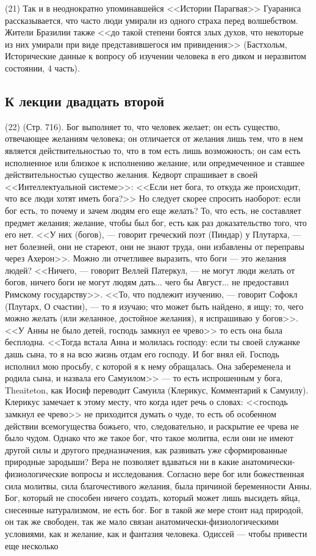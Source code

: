 \documentclass[12pt]{article}
\begin{document}
(21) Так и в неоднократно упоминавшейся <<Истории Парагвая>> Гуараниса рассказывается, что часто люди умирали из одного страха перед волшебством. Жители Бразилии также <<до такой степени боятся злых духов, что некоторые из них умирали при виде представившегося им привидения>> (Бастхольм, Исторические данные к вопросу об изучении человека в его диком и неразвитом состоянии, 4 часть). 

\subsection*{К лекции двадцать второй}

(22) (Стр. 716). Бог выполняет то, что человек желает; он есть существо, отвечающее желаниям человека; он отличается от желания лишь тем, что в нем является действительностью то, что в том есть лишь возможность; он сам есть исполненное или близкое к исполнению желание, или опредмеченное и ставшее действительностью существо желания. Кедворт спрашивает в своей <<Интеллектуальной системе>>: <<Если нет бога, то откуда же происходит, что все люди хотят иметь бога?>> Но следует скорее спросить наоборот: если бог есть, то почему и зачем людям его еще желать? То, что есть, не составляет предмет желания; желание, чтобы был бог, есть как раз доказательство того, что его нет. <<У них (богов), --- говорит греческий поэт (Пиндар) у Плутарха, --- нет болезней, они не стареют, они не знают труда, они избавлены от переправы через Ахерон>>. Можно ли отчетливее выразить, что боги --- это желания людей? <<Ничего, --- говорит Веллей Патеркул, --- не могут люди желать от богов, ничего боги не могут людям дать... чего бы Август... не предоставил Римскому государству>>. <<То, что подлежит изучению, --- говорит Софокл (Плутарх, О счастии), --- то я изучаю; что может быть найдено, я ищу; то, чего можно желать (или желанное, достойное желания), я испрашиваю у богов>>. <<У Анны не было детей, господь замкнул ее чрево>>  то есть она была бесплодна. <<Тогда встала Анна и молилась господу: если ты своей служанке дашь сына, то я на всю жизнь отдам его господу. И бог внял ей. Господь исполнил мою просьбу, с которой я к нему обращалась. Она забеременела и родила сына, и назвала его Самуилом>>  --- то есть испрошенным у бога, Theaiteton, как Иосиф переводит Самуила (Клерикус, Комментарий к Самуилу). Клерикус замечает к этому месту, что когда идет речь о словах: <<господь замкнул ее чрево>>  не приходится думать о чуде, то есть об особенном действии всемогущества божьего, что, следовательно, и раскрытие ее чрева не было чудом. Однако что же такое бог, что такое молитва, если они не имеют другой силы и другого предназначения, как развивать уже сформированные природные зародыши? Вера не позволяет вдаваться ни в какие анатомически-физиологические вопросы и исследования. Согласно вере бог или божественная сила молитвы, сила благочестивого желания, была причиной беременности Анны. Бог, который не способен ничего создать, который может лишь высидеть яйца, снесенные натурализмом, не есть бог. Бог в такой же мере стоит над природой, он так же свободен, так же мало связан анатомически-физиологическими условиями, как и желание, как и фантазия человека. Одиссей --- чтобы привести еще несколько 
\end{document}
